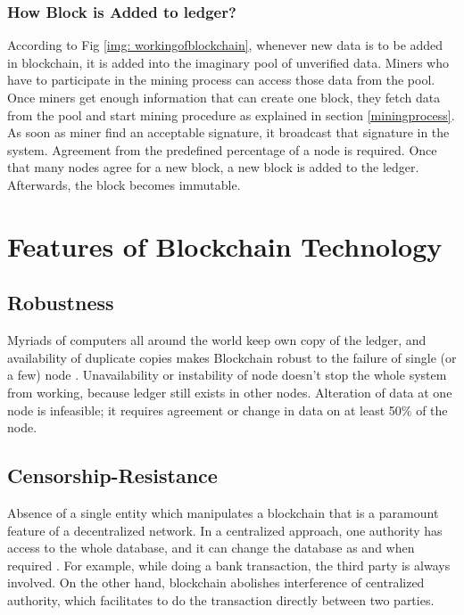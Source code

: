 \documentclass[a4paper,twoside,12pt]{report}
\begin{document}
\begin{spacing}{1.5}
\subsubsection{How Block is Added to ledger?}
According to Fig \ref{img: workingofblockchain}, whenever new data is to be added in blockchain, it is added into the imaginary pool of unverified data. Miners who have to participate in the mining process can access those data from the pool. Once miners get enough information that can create one block, they fetch data from the pool and start mining procedure as explained in section \ref{miningprocess}. As soon as miner find an acceptable signature, it broadcast that signature in the system. Agreement from the predefined percentage of a node is required. Once that many nodes agree for a new block, a new block is added to the ledger. Afterwards, the block becomes immutable.
\section{Features of Blockchain Technology}
\subsection{Robustness}
Myriads of computers all around the world keep own copy of the ledger, and availability of duplicate copies makes Blockchain robust to the failure of single (or a few) node \cite{satoshinakamoto}. Unavailability or instability of node doesn't stop the whole system from working, because ledger still exists in other nodes. Alteration of data at one node is infeasible; it requires agreement or change in data on at least 50\% of the node.
\subsection{Censorship-Resistance}
Absence of a single entity which manipulates a blockchain that is a paramount feature of a decentralized network. In a centralized approach, one authority has access to the whole database, and it can change the database as and when required \cite{satoshinakamoto}. For example, while doing a bank transaction, the third party is always involved. On the other hand, blockchain abolishes interference of centralized authority, which facilitates to do the transaction directly between two parties.

\end{spacing}
\end{document}
